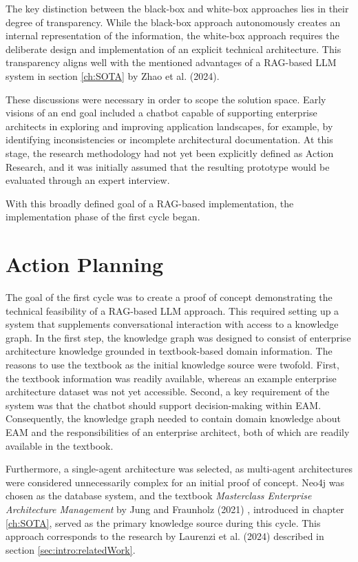 The key distinction between the black-box and white-box approaches lies in their degree of transparency. While the black-box approach autonomously creates an internal representation of the information, the white-box approach requires the deliberate design and implementation of an explicit technical architecture. This transparency aligns well with the mentioned advantages of a RAG-based LLM system in section \ref{ch:SOTA} by Zhao et al. (2024). \cite{zhao2024retrieval}

These discussions were necessary in order to scope the solution space. Early visions of an end goal included a chatbot capable of supporting enterprise architects in exploring and improving application landscapes, for example, by identifying inconsistencies or incomplete architectural documentation. At this stage, the research methodology had not yet been explicitly defined as Action Research, and it was initially assumed that the resulting prototype would be evaluated through an expert interview.

With this broadly defined goal of a RAG-based implementation, the implementation phase of the first cycle began.

\section{Action Planning}
\label{sec:cycle1_planning}
The goal of the first cycle was to create a proof of concept demonstrating the technical feasibility of a RAG-based LLM approach. This required setting up a system that supplements conversational interaction with access to a knowledge graph. In the first step, the knowledge graph was designed to consist of enterprise architecture knowledge grounded in textbook-based domain information. The reasons to use the textbook as the initial knowledge source were twofold. First, the textbook information was readily available, whereas an example enterprise architecture dataset was not yet accessible. Second, a key requirement of the system was that the chatbot should support decision-making within EAM. Consequently, the knowledge graph needed to contain domain knowledge about EAM and the responsibilities of an enterprise architect, both of which are readily available in the textbook.

Furthermore, a single-agent architecture was selected, as multi-agent architectures were considered unnecessarily complex for an initial proof of concept. Neo4j was chosen as the database system, and the textbook \textit{Masterclass Enterprise Architecture Management} by Jung and Fraunholz (2021) \cite{jung2021masterclass}, introduced in chapter \ref{ch:SOTA}, served as the primary knowledge source during this cycle. This approach corresponds to the research by Laurenzi et al. (2024) \cite{laurenzi2024llm} described in section \ref{sec:intro:relatedWork}.

